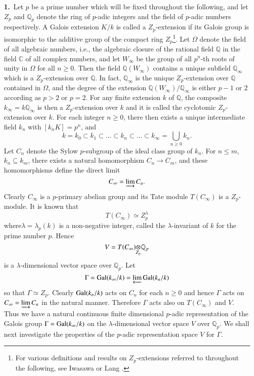 \smallskip
{\bf 1.}~Let $p$ be a prime number which will be fixed throughout the following, and let $Z_{p}$ and $\mathbb{Q}_{p}$ denote the ring of $p$-adic integers and the field of $p$-adic numbers respectively. A Galois extension $K/k$ is called a $Z_{p}$-extension if its Galois group is isomorphic to the additive group of the compact ring $Z_{p}$\footnote[1]{For various definitions and results on $Z_{p}$-extensions referred to throughout the following, see Iwasawa \cite{art4-key5} or Lang \cite{art4-key6}.}. Let $\Omega$ denote the field of all algebraic numbers, i.e., the algebraic closure of the rational field $\mathbb{Q}$ in the field $\mathbb{C}$ of all complex numbers, and let $W_{\infty}$ be the group of all $p^{n}$-th roots of unity in $\Omega$ for all $n\geq 0$. Then the field $\mathbb{Q}(W_{\infty})$ contains a unique subfield $\mathbb{Q}_{\infty}$ which is a $Z_{p}$-extension over $\mathbb{Q}$. In fact, $\mathbb{Q}_{\infty}$ is the unique $Z_{p}$-extension over $\mathbb{Q}$ contained in $\Omega$, and the degree of the extension $\mathbb{Q}(W_{\infty})/\mathbb{Q}_{\infty}$ is either $p-1$ or $2$ according as $p>2$ or $p=2$. For any finite extension $k$ of $\mathbb{Q}$, the composite $k_{\infty}=k\mathbb{Q}_{\infty}$ is then a $Z_{p}$-extension over $k$ and it is called the cyclotomic $Z_{p}$-extension over $k$. For each integer $n\geq 0$, there then exists a unique intermediate field $k_{n}$ with $[k_{n}K]=p^{n}$, and
$$
k=k_{0}\subset k_{1}\subset\ldots\subset k_{n}\subset\ldots\subset k_{\infty}=\bigcup\limits_{n\geq 0}k_{n}.
$$
Let $C_{n}$ denote the Sylow $p$-subgroup of the ideal class group of $k_{n}$. For $n\leq m$, $k_{n}\subseteq k_{m}$, there exists a natural homomorphism $C_{n}\to C_{m}$, and these homomorphisms define the direct limit
$$
C_{\infty}=\varinjlim C_{n}.
$$ 
Clearly $C_{\infty}$ is a $p$-primary abelian group and its Tate module $T(C_{\infty})$ is a $Z_{p}$-module. It is known that 
$$
T(C_{\infty})\simeq Z^{\lambda}_{p}
$$
where\pageoriginale $\lambda=\lambda_{p}(k)$ is a non-negative integer, called the $\lambda$-invariant of $k$ for the prime number $p$. Hence
$$
\foprod{V=T(C_{\infty})}{\mathbb{Q}_{p}}{Z_{p}}
$$
is a $\lambda$-dimensional vector space over $\mathbb{Q}_{p}$. Let
$$
\Gamma=\operatorname{Gal}(k_{\infty}/k)=\varprojlim \operatorname{Gal}(k_{n}/k)
$$
so that $\Gamma\simeq Z_{p}$. Clearly $\operatorname{Gal}(k_{n}/k)$ acts on $C_{n}$ for each $n\geq 0$ and hence $\Gamma$ acts on $C_{\infty}=\varinjlim C_{n}$ in the natural manner. Therefore $\Gamma$ acts also on $T(C_{\infty})$ and $V$. Thus we have a natural continuous finite dimensional $p$-adic representation of the Galois group $\Gamma=\operatorname{Gal}(k_{\infty}/k)$ on the $\lambda$-dimensional vector space $V$ over $\mathbb{Q}_{p}$. We shall next investigate the properties of the $p$-adic representation space $V$ for $\Gamma$.

